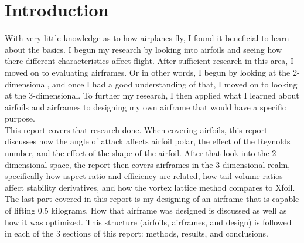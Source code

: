 \documentclass[journal]{new-aiaa}
\begin{document}
\begin{abstract}
	\end{abstract}
	
	
	
	
	\section{Introduction}
	\label{sec:intro}
	
	
	
	
	
	
	With very little knowledge as to how airplanes fly, I found it beneficial to learn about the basics. I begun my research by looking into airfoils and seeing how there different characteristics affect flight. After sufficient research in this area, I moved on to evaluating airframes. Or in other words, I begun by looking at the 2-dimensional, and once I had a good understanding of that, I moved on to looking at the 3-dimensional. To further my research, I then applied what I learned about airfoils and airframes to designing my own airframe that would have a specific purpose.\\
	
	This report covers that research done. When covering airfoils, this report discusses how the angle of attack affects airfoil polar, the effect of the Reynolds number, and the effect of the shape of the airfoil. After that look into the 2-dimensional space, the report then covers airframes in the 3-dimensional realm, specifically how aspect ratio and efficiency are related, how tail volume ratios affect stability derivatives, and how the vortex lattice method compares to Xfoil.\\
	
	The last part covered in this report is my designing of an airframe that is capable of lifting 0.5 kilograms. How that airframe was designed is discussed as well as how it was optimized. This structure (airfoils, airframes, and design) is followed in each of the 3 sections of this report: methods, results, and conclusions.\\
	
\end{document}
